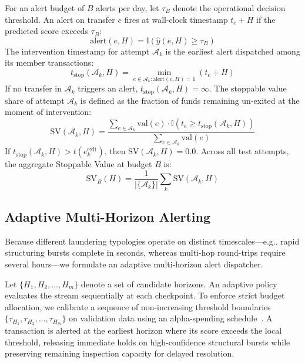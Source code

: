 \documentclass[10pt,twocolumn,letterpaper]{article}
\begin{document}
For an alert budget of $B$ alerts per day, let $\tau_B$ denote the operational decision threshold. An alert on transfer $e$ fires at wall-clock timestamp $t_e + H$ if the predicted score exceeds $\tau_B$:
\begin{equation}
\text{alert}(e, H) = \mathbb{I}(\hat{y}(e, H) \ge \tau_B)
\end{equation}
The intervention timestamp for attempt $\mathcal{A}_k$ is the earliest alert dispatched among its member transactions:
\begin{equation}
t_{\text{stop}}(\mathcal{A}_k, H) = \min_{e \in \mathcal{A}_k : \text{alert}(e, H) = 1} (t_e + H)
\end{equation}
If no transfer in $\mathcal{A}_k$ triggers an alert, $t_{\text{stop}}(\mathcal{A}_k, H) = \infty$. The stoppable value share of attempt $\mathcal{A}_k$ is defined as the fraction of funds remaining un-exited at the moment of intervention:
\begin{equation}
\text{SV}(\mathcal{A}_k, H) = \frac{\sum_{e \in \mathcal{A}_k} \text{val}(e) \cdot \mathbb{I}(t_e \ge t_{\text{stop}}(\mathcal{A}_k, H))}{\sum_{e \in \mathcal{A}_k} \text{val}(e)}
\end{equation}
If $t_{\text{stop}}(\mathcal{A}_k, H) > t(e_k^{\text{exit}})$, then $\text{SV}(\mathcal{A}_k, H) = 0.0$. Across all test attempts, the aggregate Stoppable Value at budget $B$ is:
\begin{equation}
\text{SV}_B(H) = \frac{1}{|\{\mathcal{A}_k\}|} \sum_k \text{SV}(\mathcal{A}_k, H)
\end{equation}

\subsection{Adaptive Multi-Horizon Alerting}
Because different laundering typologies operate on distinct timescales—e.g., rapid structuring bursts complete in seconds, whereas multi-hop round-trips require several hours—we formulate an adaptive multi-horizon alert dispatcher. 

Let $\{H_1, H_2, \dots, H_m\}$ denote a set of candidate horizons. An adaptive policy evaluates the stream sequentially at each checkpoint. To enforce strict budget allocation, we calibrate a sequence of non-increasing threshold boundaries $\{\tau_{H_1}, \tau_{H_2}, \dots, \tau_{H_m}\}$ on validation data using an alpha-spending schedule~\cite{lan1983alpha}. A transaction is alerted at the earliest horizon where its score exceeds the local threshold, releasing immediate holds on high-confidence structural bursts while preserving remaining inspection capacity for delayed resolution.
\end{document}
